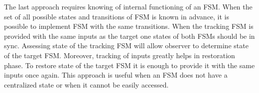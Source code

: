 The last approach requires knowing of internal functioning of an FSM. When the
set of all possible states and transitions of FSM is known in advance, it is
possible to implement FSM with the same transitions. When the tracking FSM is
provided with the same inputs as the target one states of both FSMs should be
in sync. Assessing state of the tracking FSM will allow observer to determine
state of the target FSM.  Moreover, tracking of inputs greatly helps in
restoration phase. To restore state of the target FSM it is enough to provide
it with the same inputs once again. This approach is useful when an FSM does
not have a centralized state or when it cannot be easily accessed.

